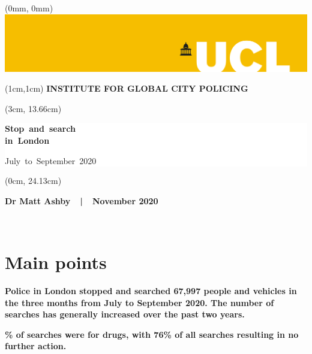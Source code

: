 \documentclass[
  a4paper,
  twoside, 11pt]{article}
\begin{document}
\begin{textblock*}{21cm}(0mm, 0mm)
\includegraphics[width=21cm]{ucl-banner-port-yellow-rgb-lg.png}
\end{textblock*}

\begin{textblock*}{21cm}(1cm,1cm)
\textbf{\sffamily INSTITUTE FOR GLOBAL CITY POLICING}
\end{textblock*}

\begin{textblock*}{18cm}(3cm, 13.66cm)
\raggedright \sffamily
\begin{singlespace}
\colorbox{white}{\hspace{1cm}\parbox[c][5.9cm]{16cm}{
{\fontsize{40}{32}\selectfont \bfseries \mbox{Stop and search}\\\mbox{in London}
\vspace{6pt}}

{\fontsize{40}{32}\selectfont \mbox{July to September 2020} }

}\hspace{1cm}}
\end{singlespace}
\end{textblock*}

\begin{textblock*}{11.43cm}(0cm, 24.13cm)
\colorbox{uclyellow}{\parbox[c][2.63cm]{\textwidth}{
\centering \bfseries \sffamily \fontsize{16}{16}\selectfont 
Dr Matt Ashby\ \ |\ \ November 2020
}}
\end{textblock*}

~

\thispagestyle{empty}
\newpage

\hypertarget{main-points}{%
\section{Main points}\label{main-points}}

\textbf{\sffamily Police in London stopped and searched 67,997 people and vehicles in the three months from July to September 2020. The number of searches has generally increased over the past two years.}

\textbf{\% of searches were for drugs, with 76\% of all searches resulting in no further action.}
\end{document}
